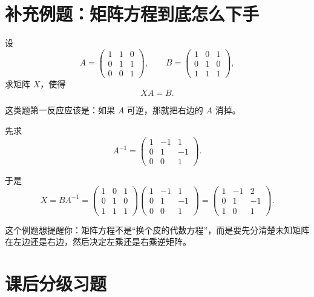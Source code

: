 \documentclass[11pt,oneside,UTF8]{ctexbook}
\begin{document}
\section{补充例题：矩阵方程到底怎么下手}

\begin{examplebox}
设
\[
A=\begin{pmatrix}
1&1&0\\
0&1&1\\
0&0&1
\end{pmatrix},
\qquad
B=\begin{pmatrix}
1&0&1\\
0&1&0\\
1&1&1
\end{pmatrix},
\]
求矩阵 \(X\)，使得
\[
XA=B.
\]

\tcblower

这类题第一反应应该是：如果 \(A\) 可逆，那就把右边的 \(A\) 消掉。

先求
\[
A^{-1}=
\begin{pmatrix}
1&-1&1\\
0&1&-1\\
0&0&1
\end{pmatrix}.
\]

于是
\[
X=BA^{-1}
=
\begin{pmatrix}
1&0&1\\
0&1&0\\
1&1&1
\end{pmatrix}
\begin{pmatrix}
1&-1&1\\
0&1&-1\\
0&0&1
\end{pmatrix}
=
\begin{pmatrix}
1&-1&2\\
0&1&-1\\
1&0&1
\end{pmatrix}.
\]

这个例题想提醒你：矩阵方程不是“换个皮的代数方程”，而是要先分清楚未知矩阵在左边还是右边，然后决定左乘还是右乘逆矩阵。
\end{examplebox}

\section{课后分级习题}
\end{document}
